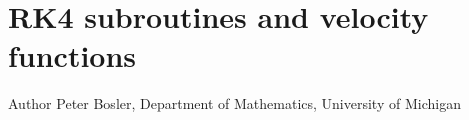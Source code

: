 \hypertarget{group___advection}{\section{R\+K4 subroutines and velocity functions}
\label{group___advection}
}
\begin{DoxyAuthor}{Author}
Peter Bosler, Department of Mathematics, University of Michigan 
\end{DoxyAuthor}
